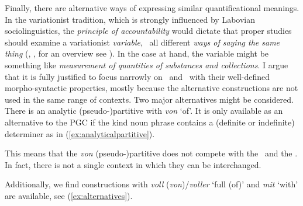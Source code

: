 Finally, there are alternative ways of expressing similar quantificational meanings.
In the variationist tradition, which is strongly influenced by Labovian sociolinguistics, the \textit{principle of accountability} would dictate that proper studies should examine a variationist \textit{variable}, \ie\ all different \textit{ways of saying the same thing} (\citealp{Labov1966}, \citealp{Labov1969}, for an overview see \citealp{Tagliamonte2012}).
In the case at hand, the variable might be something like \textit{measurement of quantities of substances and collections}.
I argue that it is fully justified to focus narrowly on \NACa\ and \PGCa\ with their well-defined morpho-syntactic properties, mostly because the alternative constructions are not used in the same range of contexts.
Two major alternatives might be considered.
There is an analytic (pseudo-)partitive with \textit{von} `of'.
It is only available as an alternative to the PGC if the kind noun phrase contains a (definite or indefinite) determiner as in (\ref{ex:analyticalpartitive}).

\begin{exe}
  \ex\label{ex:analyticalpartitive} 
  \begin{xlist}
  \end{xlist}
\end{exe}

This means that the \textit{von} (pseudo-)partitive does not compete with the \NACa\ and the \PGCa.
In fact, there is not a single context in which they can be interchanged. 

Additionally, we find constructions with \textit{voll} (\textit{von})\slash\textit{voller} `full (of)' and \textit{mit} `with' are available, see (\ref{ex:alternatives}).

